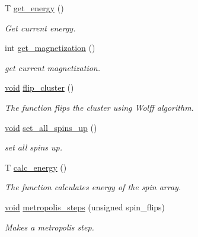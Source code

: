 \begin{DoxyCompactItemize}
T \mbox{\hyperlink{classIsingModel_a37a7c509999f21f1bd4f54a12009f3cf}{get\+\_\+energy}} ()
\begin{DoxyCompactList}\small\item\em Get current energy. \end{DoxyCompactList}\item 
int \mbox{\hyperlink{classIsingModel_a58c9ebc61c0b2238fd52b62df8ce4853}{get\+\_\+magnetization}} ()
\begin{DoxyCompactList}\small\item\em get current magnetization. \end{DoxyCompactList}\item 
\mbox{\hyperlink{glad_8h_a950fc91edb4504f62f1c577bf4727c29}{void}} \mbox{\hyperlink{classIsingModel_ab76a4eee808eaa1979ff6707498e9908}{flip\+\_\+cluster}} ()
\begin{DoxyCompactList}\small\item\em The function flips the cluster using Wolff algorithm. \end{DoxyCompactList}\item 
\mbox{\hyperlink{glad_8h_a950fc91edb4504f62f1c577bf4727c29}{void}} \mbox{\hyperlink{classIsingModel_ac16bfdd5bb4012162bedd90034962f58}{set\+\_\+all\+\_\+spins\+\_\+up}} ()
\begin{DoxyCompactList}\small\item\em set all spins up. \end{DoxyCompactList}\item 
T \mbox{\hyperlink{classIsingModel_a0a387ccae720604f4de13d5b0762ac62}{calc\+\_\+energy}} ()
\begin{DoxyCompactList}\small\item\em The function calculates energy of the spin array. \end{DoxyCompactList}\item 
\mbox{\hyperlink{glad_8h_a950fc91edb4504f62f1c577bf4727c29}{void}} \mbox{\hyperlink{classIsingModel_a195316f577d71297e9634fa6fdeacc44}{metropolis\+\_\+steps}} (unsigned spin\+\_\+flips)
\begin{DoxyCompactList}\small\item\em Makes a metropolis step. \end{DoxyCompactList}\end{DoxyCompactItemize}

